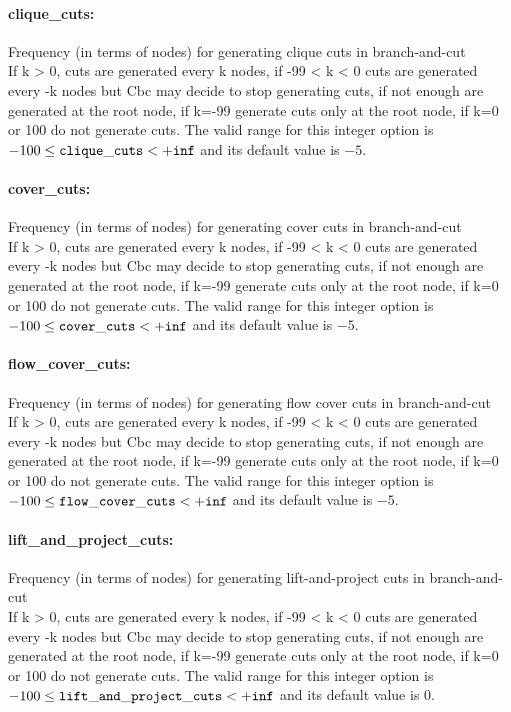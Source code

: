 \paragraph{clique\_cuts:}\label{sec:clique_cuts} Frequency (in terms of nodes) for generating clique cuts in branch-and-cut $\;$ \\
 If k > 0, cuts are generated every k nodes, if
-99 < k < 0 cuts are generated every -k nodes but
Cbc may decide to stop generating cuts, if not
enough are generated at the root node, if k=-99
generate cuts only at the root node, if k=0 or
100 do not generate cuts. The valid range for this integer option is
$-100 \le {\tt clique\_cuts } <  {\tt +inf}$
and its default value is $-5$.


\paragraph{cover\_cuts:}\label{sec:cover_cuts} Frequency (in terms of nodes) for generating cover cuts in branch-and-cut $\;$ \\
 If k > 0, cuts are generated every k nodes, if
-99 < k < 0 cuts are generated every -k nodes but
Cbc may decide to stop generating cuts, if not
enough are generated at the root node, if k=-99
generate cuts only at the root node, if k=0 or
100 do not generate cuts. The valid range for this integer option is
$-100 \le {\tt cover\_cuts } <  {\tt +inf}$
and its default value is $-5$.


\paragraph{flow\_cover\_cuts:}\label{sec:flow_cover_cuts} Frequency (in terms of nodes) for generating flow cover cuts in branch-and-cut $\;$ \\
 If k > 0, cuts are generated every k nodes, if
-99 < k < 0 cuts are generated every -k nodes but
Cbc may decide to stop generating cuts, if not
enough are generated at the root node, if k=-99
generate cuts only at the root node, if k=0 or
100 do not generate cuts. The valid range for this integer option is
$-100 \le {\tt flow\_cover\_cuts } <  {\tt +inf}$
and its default value is $-5$.


\paragraph{lift\_and\_project\_cuts:}\label{sec:lift_and_project_cuts} Frequency (in terms of nodes) for generating lift-and-project cuts in branch-and-cut $\;$ \\
 If k > 0, cuts are generated every k nodes, if
-99 < k < 0 cuts are generated every -k nodes but
Cbc may decide to stop generating cuts, if not
enough are generated at the root node, if k=-99
generate cuts only at the root node, if k=0 or
100 do not generate cuts. The valid range for this integer option is
$-100 \le {\tt lift\_and\_project\_cuts } <  {\tt +inf}$
and its default value is $0$.


